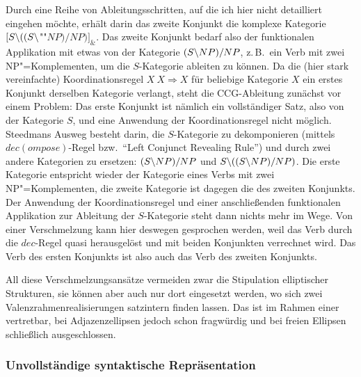 Durch eine Reihe von Ableitungsschritten, auf die ich hier nicht detailliert eingehen möchte, erhält darin das zweite Konjunkt die komplexe Kategorie $[S\backslash ((S\backslash$""$\mathit{NP})/\mathit{NP})]_\&$. Das zweite Konjunkt bedarf also der funktionalen Applikation mit etwas von der Kategorie $(S\backslash NP)/NP$, z.\,B.\ ein Verb mit zwei NP"=Komplementen, um die $S$-Kategorie ableiten zu können. Da die (hier stark vereinfachte) Koordinationsregel $X ~ X \Rightarrow X$ für beliebige Kategorie $X$ ein erstes Konjunkt derselben Kategorie verlangt, steht die CCG-Ableitung zunächst vor einem Problem: Das erste Konjunkt ist nämlich ein vollständiger Satz, also von der Kategorie $S$, und eine Anwendung der Koordinationsregel nicht möglich. Steedmans Ausweg besteht darin, die $S$-Kategorie zu dekomponieren (mittels $dec(ompose)$-Regel bzw.\ "`Left Conjunct Revealing Rule"') und durch zwei andere Kategorien zu ersetzen: $(S\backslash NP)/NP$ und $S\backslash((S\backslash NP)/NP)$. Die erste Kategorie entspricht wieder der Kategorie eines Verbs mit zwei NP"=Komplementen, die zweite Kategorie ist dagegen die des zweiten Konjunkts. Der Anwendung der Koordinationsregel und einer anschlie\ss enden funktionalen Applikation zur Ableitung der $S$-Kategorie steht dann nichts mehr im Wege. Von einer Verschmelzung kann hier deswegen gesprochen werden, weil das Verb durch die $dec$-Regel quasi herausgelöst und mit beiden Konjunkten verrechnet wird. Das Verb des ersten Konjunkts ist also auch das Verb des zweiten Konjunkts. 

All diese Verschmelzungsansätze vermeiden zwar die Stipulation elliptischer Strukturen, sie können aber auch nur dort eingesetzt werden, wo sich zwei Valenzrahmenrealisierungen satzintern finden lassen. Das ist im Rahmen einer  vertretbar, bei Adjazenzellipsen jedoch schon fragwürdig und bei freien Ellipsen schlie\ss lich ausgeschlossen.

\subsubsection*{Unvollständige syntaktische Repräsentation}  

